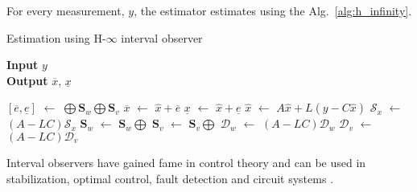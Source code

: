 For every measurement, $y$, the estimator estimates using the Alg.~\ref{alg:h_infinity}.
\begin{algorithm}
		
        \caption{Estimation using H-$\infty$ interval observer}
        \textbf{Input} $y$\\
 		\textbf{Output} $\overline{x}$, $\underline{x}$
        \begin{algorithmic}[1]
        \State $[\overline{e}, \underline{e}]$ $\gets$ $\bigoplus \textbf{S}_w \bigoplus \textbf{S}_v$ \label{alg:main_constraints}
        \State $\overline{x}$ $\gets$ $\hat{x} + \overline{e}$
        \State $\underline{x}$ $\gets$ $\hat{x} + \underline{e}$
        \State $\hat{x}$ $\gets$ $A\hat{x} + L(y- C\hat{x})$ \label{alg:main_reac}
        \State $\mathcal{S}_x$ $\gets$ $(A-LC)\mathcal{S}_x$
        \State $\textbf{S}_w$ $\gets$ $\textbf{S}_w \bigoplus$ 
        \State $\textbf{S}_v$ $\gets$ $\textbf{S}_v \bigoplus$ 
        \State $\mathcal{D}_w$ $\gets$ $(A-LC)\mathcal{D}_w$
        \State $\mathcal{D}_v$ $\gets$ $(A-LC)\mathcal{D}_v$
        \end{algorithmic}
        \label{alg:h_infinity}
\end{algorithm}

Interval observers have gained fame in control theory and can be used in stabilization, optimal control, fault detection and circuit systems \cite{Huang2019}.



